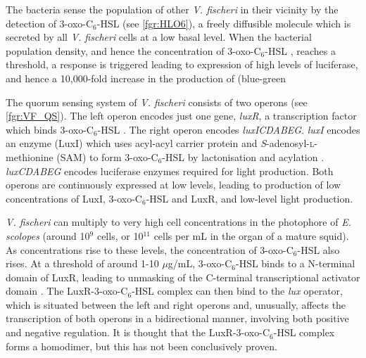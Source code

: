 The bacteria sense the population of other \textit{V. fischeri} in their vicinity by the detection of 3-oxo-C$_6$-HSL \cite{Eberhard1981} (see \ref{fgr:HLO6}), a freely diffusible\cite{Kaplan1985} molecule which is secreted by all \textit{V. fischeri} cells\cite{Schaefer1996} at a low basal level\cite{Miller2001}. When the bacterial population density, and hence the concentration of 3-oxo-C$_6$-HSL , reaches a threshold, a response is triggered leading to expression of high levels of luciferase, and hence a 10,000-fold\cite{Devine1989} increase in the production of (blue-green%

The quorum sensing system of \textit{V. fischeri} consists of two operons (see \ref{fgr:VF_QS}). The left operon encodes just one gene, \textit{luxR}, a transcription factor which binds 3-oxo-C$_6$-HSL . The right operon encodes \textit{luxICDABEG}. \textit{luxI} encodes an enzyme (LuxI) which uses acyl-acyl carrier protein and \textit{S}-adenosyl-\textsc{l}-methionine (SAM) to form 3-oxo-C$_6$-HSL  by lactonisation and acylation \cite{Parsek1999, Watson2002}. \textit {luxCDABEG} encodes luciferase enzymes required for light production. Both operons are continuously expressed at low levels, leading to production of low concentrations of LuxI, 3-oxo-C$_6$-HSL  and LuxR, and low-level light production\cite{Engebrecht1983}. 

\textit{V. fischeri} can multiply to very high cell concentrations in the photophore of \textit{E. scolopes} (around 10$^9$ cells\cite{Ruby1993, Ruby1998, Nyholm1998}, or 10$^{11}$ cells per mL \cite{Miller2001} in the organ of a mature squid). As concentrations rise to these levels, the concentration of 3-oxo-C$_6$-HSL  also rises. At a threshold of around 1-10 $\mu$g/mL\cite{Eberhard1981}, 3-oxo-C$_6$-HSL  binds to a N-terminal domain of LuxR\cite{Hanzelka1995}, leading to unmasking of the C-terminal transcriptional activator domain \cite{Choi1991,Choi1992}. The LuxR-3-oxo-C$_6$-HSL complex can then bind to the \textit{lux} operator, which is situated between the left and right operons and, unusually, affects the transcription of both operons in a bidirectional manner, involving both positive and negative regulation\cite{Shadel1991}. It is thought that the LuxR-3-oxo-C$_6$-HSL complex forms a homodimer\cite{Choi1992a}, but this has not been conclusively proven\cite{Antunes2008,Miyashiro2012}.

